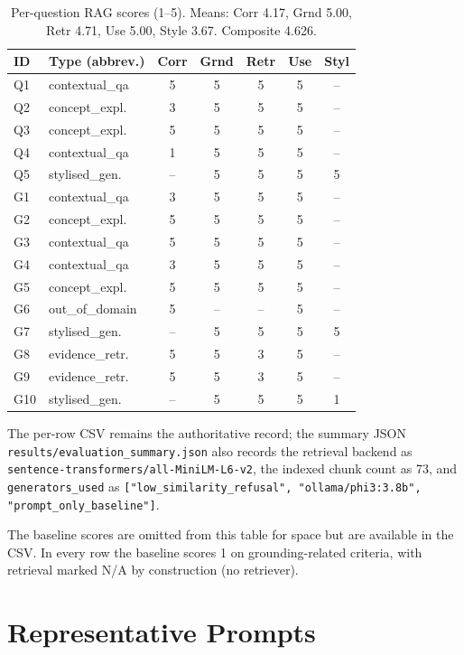 \documentclass[10pt,conference]{IEEEtran}
\begin{document}
\begin{table}[h]
\centering
\caption{Per-question RAG scores (1--5). Means: Corr 4.17, Grnd 5.00, Retr 4.71, Use 5.00, Style 3.67. Composite 4.626.}
\label{tab:full-eval-rag}
\small
\begin{tabularx}{\linewidth}{lXccccc}
\toprule
ID & Type (abbrev.) & Corr & Grnd & Retr & Use & Styl \\
\midrule
Q1 & contextual\_qa     & 5 & 5 & 5 & 5 & -- \\
Q2 & concept\_expl.     & 3 & 5 & 5 & 5 & -- \\
Q3 & concept\_expl.     & 5 & 5 & 5 & 5 & -- \\
Q4 & contextual\_qa     & 1 & 5 & 5 & 5 & -- \\
Q5 & stylised\_gen.     & -- & 5 & 5 & 5 & 5 \\
G1 & contextual\_qa     & 3 & 5 & 5 & 5 & -- \\
G2 & concept\_expl.     & 5 & 5 & 5 & 5 & -- \\
G3 & contextual\_qa     & 5 & 5 & 5 & 5 & -- \\
G4 & contextual\_qa     & 3 & 5 & 5 & 5 & -- \\
G5 & concept\_expl.     & 5 & 5 & 5 & 5 & -- \\
G6 & out\_of\_domain    & 5 & --& --& 5 & -- \\
G7 & stylised\_gen.     & -- & 5 & 5 & 5 & 5 \\
G8 & evidence\_retr.    & 5 & 5 & 3 & 5 & -- \\
G9 & evidence\_retr.    & 5 & 5 & 3 & 5 & -- \\
G10& stylised\_gen.     & -- & 5 & 5 & 5 & 1 \\
\bottomrule
\end{tabularx}
\end{table}

The per-row CSV remains the authoritative record; the summary JSON
\verb|results/evaluation_summary.json| also records the retrieval
backend as \texttt{sentence-transformers/all-MiniLM-L6-v2}, the
indexed chunk count as 73, and \texttt{generators\_used} as
\texttt{["low\_similarity\_refusal", "ollama/phi3:3.8b",
"prompt\_only\_baseline"]}.

The baseline scores are omitted from this table for space but are
available in the CSV. In every row the baseline scores 1 on
grounding-related criteria, with retrieval marked N/A by construction
(no retriever).

\section{Representative Prompts}
\label{app:prompts}
\end{document}
